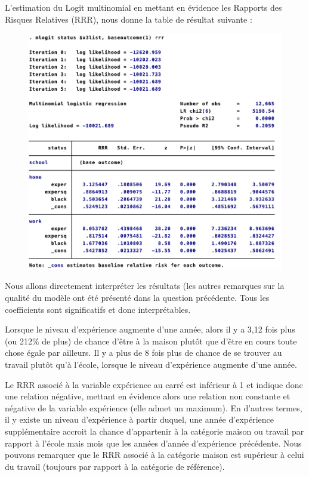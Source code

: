 L'estimation du Logit multinomial en mettant en évidence les Rapports des Risques Relatives (RRR), nous donne la table de résultat suivante : 

\begin{figure}[h]
    \includegraphics[scale = 0.55]{100_tab_results/mlogitRRR.png}
    \centering
\end{figure}

Nous allons directement interpréter les résultats (les autres remarques sur la qualité du modèle ont été présenté dans la question précédente. Tous les coefficients sont significatifs et donc interprétables.

\vspace*{0.3cm}

Lorsque le niveau d’expérience augmente d’une année, alors il y a 3,12 fois plus (ou 212\% de plus) de chance d’être à la maison plutôt que d’être en cours toute chose égale par ailleurs. Il y a plus de 8 fois plus de chance de se trouver au travail plutôt qu’à l’école, lorsque le niveau d’expérience augmente d’une année. 

\vspace*{0.3cm}

Le RRR associé à la variable expérience au carré est inférieur à 1 et indique donc une relation négative, mettant en évidence alors une relation non constante et négative de la variable expérience (elle admet un maximum). En d’autres termes, il y existe un niveau d’expérience à partir duquel, une année d’expérience supplémentaire accroit la chance d’appartenir à la catégorie maison ou travail par rapport à l’école mais mois que les années d’année d’expérience précédente. Nous pouvons remarquer que le RRR associé à la catégorie maison est supérieur à celui du travail (toujours par rapport à la catégorie de référence). 


